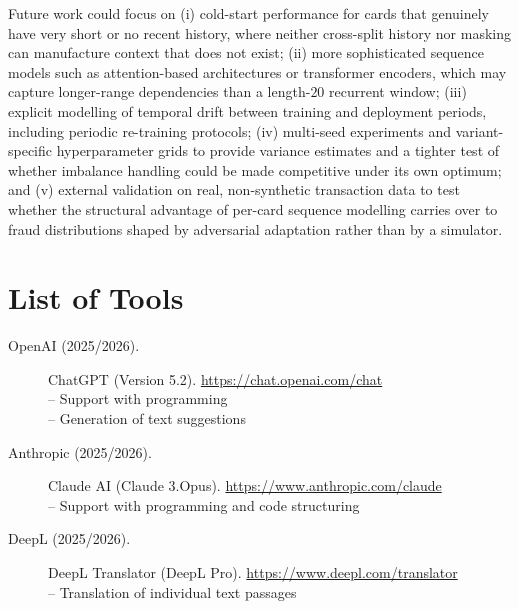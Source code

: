 \documentclass[oneside,12pt,parskip=half,american,numbers=noenddot]{scrreprt}
\begin{document}
Future work could focus on (i) cold-start performance for cards that genuinely have very short or no recent history, where neither cross-split history nor masking can manufacture context that does not exist; (ii) more sophisticated sequence models such as attention-based architectures or transformer encoders, which may capture longer-range dependencies than a length-$20$ recurrent window; (iii) explicit modelling of temporal drift between training and deployment periods, including periodic re-training protocols; (iv) multi-seed experiments and variant-specific hyperparameter grids to provide variance estimates and a tighter test of whether imbalance handling could be made competitive under its own optimum; and (v) external validation on real, non-synthetic transaction data to test whether the structural advantage of per-card sequence modelling carries over to fraud distributions shaped by adversarial adaptation rather than by a simulator.


\cleardoublepage
{}
\setcounter{page}{1}

\printbibliography
{} %


\chapter*{List of Tools}
\begin{description}
  \item[OpenAI (2025/2026).] ChatGPT (Version 5.2). \url{https://chat.openai.com/chat} \\
  – Support with programming \\
  – Generation of text suggestions

  \item[Anthropic (2025/2026).] Claude AI (Claude 3.Opus). \url{https://www.anthropic.com/claude} \\
  – Support with programming and code structuring

  \item[DeepL (2025/2026).] DeepL Translator (DeepL Pro). \url{https://www.deepl.com/translator} \\
  – Translation of individual text passages
\end{description}


\appendix
\end{document}

